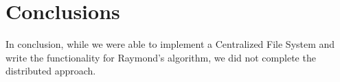 \documentclass{article}
\begin{document}
\section{Conclusions}	
In conclusion, while we were able to implement a Centralized File System and write the functionality for Raymond's algorithm, we did not complete the distributed approach.

\end{document}
